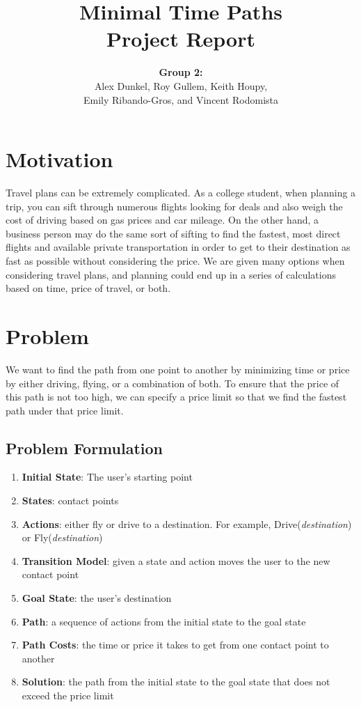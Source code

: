 \documentclass[11pt]{article}
\title{Minimal Time Paths\\Project Report}
\author{ {\bf Group 2:} \\
Alex Dunkel,
Roy Gullem,
Keith Houpy, \\
Emily Ribando-Gros, and
Vincent Rodomista}
\begin{document}
\maketitle

\section{Motivation}

Travel plans can be extremely complicated. As a college student, when planning a trip, you can sift through numerous flights looking for deals and also weigh the cost of driving based on gas prices and car mileage. On the other hand, a business person may do the same sort of sifting to find the fastest, most direct flights and available private transportation in order to get to their destination as fast as possible without considering the price. We are given many options when considering travel plans, and planning could end up in a series of calculations based on time, price of travel, or both. 

\section{Problem}
We want to find the path from one point to another by minimizing time or price by either driving, flying, or a combination of both. To ensure that the price of this path is not too high, we can specify a price limit so that we find the fastest path under that price limit.

\subsection{Problem Formulation}
\begin{enumerate}
\item \textbf{Initial State}: The user's starting point
\item \textbf{States}: contact points
\item	 \textbf{Actions}: either fly or drive to a destination. For example, Drive(\emph{destination}) or Fly(\emph{destination})
\item \textbf{Transition Model}: given a state and action moves the user to the new contact point
\item \textbf{Goal State}: the user's destination
\item \textbf{Path}: a sequence of actions from the initial state to the goal state
\item \textbf{Path Costs}: the time or price it takes to get from one contact point to another %
\item \textbf{Solution}: the path from the initial state to the goal state that does not exceed the price limit
\end{enumerate}
\end{document}
